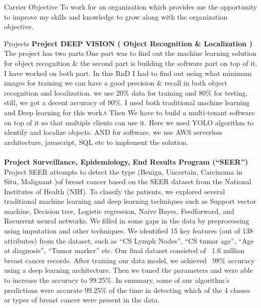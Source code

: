 \documentclass{resume} %
\begin{document}
\begin{rSection}{Carrier Objective}
 To work for an organization which provides me the opportunity to improve my skills and knowledge to grow along with the organization objective.
\end{rSection}
\begin{rSection}{Projects}
{\bf Project DEEP VISION ( Object Recognition \& Localization )}
\\The project has two parts.One part was to find out the machine learning solution for object recognition \& the second part is building the software part on top of it. I have worked on both part. In this RnD I had to find out using what minimum images for training we can have a good precision \& recall in both object recognition and localization. we use 20\% data for training and 80\% for testing. still, we got a decent accuracy of 90\%. I used both traditional machine learning and Deep learning for this work.t Then We have to build a multi-tenant software on top of it so that multiple clients can use it. Here we used YOLO algorithm to identify and localize objects. AND for software, we use AWS serverless architecture, javascript, SQL etc to implement the solution.\\
\\{\bf Project Surveillance, Epidemiology, End Results Program (“SEER”)}\\
Project SEER attempts to detect the type (Benign, Uncertain, Carcinoma in Situ, Malignant )of breast cancer based on the SEER dataset from the National Institutes of Health (NIH). To classify the patients, we explored several traditional machine learning and deep learning techniques such as Support vector machine, Decision tree, Logistic regression, Naive Bayes, Feedforward, and Recurrent neural networks. We filled in some gaps in the data by preprocessing using imputation and other techniques. We identified 15 key features (out of 138 attributes) from the dataset, such as “CS Lymph Nodes”, “CS tumor age”, “Age at diagnosis”, “Tumor marker” etc. Our final dataset consisted of ~1.6 million breast cancer records. After training our data model, we achieved ~98\% accuracy using a deep learning architecture. Then we tuned the parameters and were able to increase the accuracy to 99.25\%. In summary, some of our algorithm’s predictions were accurate 99.25\% of the time in detecting which of the 4 classes or types of breast cancer were present in the data.


\end{rSection}
\end{document}
